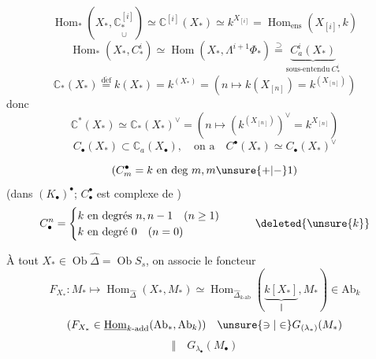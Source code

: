 
\[
\operatorname{Hom}_*(X_*,\underset{\cup}{\mathbb C_*^{[i]}})
\simeq\mathbb C^{[i]}(X_*)\simeq k^{X_{[i]}}
=\operatorname{Hom}_{\mathrm{ens}}(X_{[i]},k)
\]
\[
\operatorname{Hom}_*(X_*,C_*^i)\simeq\operatorname{Hom}(X_*,\Lambda^{i+1}\Phi_*)
\overset{\supset}{=}\underbrace{C_a^i(X_*)}_{\text{sous-entendu}\ C_*^i}
\]
\[
\mathbb C_*(X_*)\overset{\mathrm{d\acute ef}}{=}k(X_*)=k^{(X_*)}
=(n\longmapsto k(X_{[n]})=k^{(X_{[n]})})
\]
donc
\[
\mathbb C^*(X_*)\simeq\mathbb C_*(X_*)^\vee
=(n\longmapsto(k^{(X_{[n]})})^\vee=k^{X_{[n]}})
\]
\[
C_\bullet(X_*)\subset\mathbb C_a(X_{\bullet}),\quad
\text{on a}\quad C^\bullet(X_*)\simeq C_\bullet(X_*)^\vee
\]

\[
(C_m^\bullet=k\ \text{en deg }m,m\unsure{+|-}1)
\]
(dans $(K_\bullet)^\bullet$; $C_\bullet^\bullet$ est complexe de  )
\[
C_\bullet^n=\begin{cases}
k\ \text{en degrés }n,n-1\quad(n\geq1)\\
k\ \text{en degré }0\quad(n=0)
\end{cases}
\qquad\deleted{\unsure{k}}
\]


À tout $X_*\in\operatorname{Ob}\widehat\Delta=\operatorname{Ob}S_s$,
on associe le foncteur
\[
F_{X_*}:M_*\longmapsto\operatorname{Hom}_{\widehat\Delta}(X_*,M_*)
\simeq\operatorname{Hom}_{\widehat\Delta_{k\text{-ab}}}
(\underbrace{k[X_*]}_{\Vert},M_*)\in\mathrm{Ab}_k
\]
\[
(F_{X_*}\in\underline{\operatorname{Hom}}_{k\text{-add}}(\mathrm{Ab}_*,\mathrm{Ab}_k))
\quad\unsure{\ni|\in}G_{(\lambda_*)}(M_*)
\]
\[
\Vert\quad G_{\lambda_\bullet}(M_\bullet)
\]

